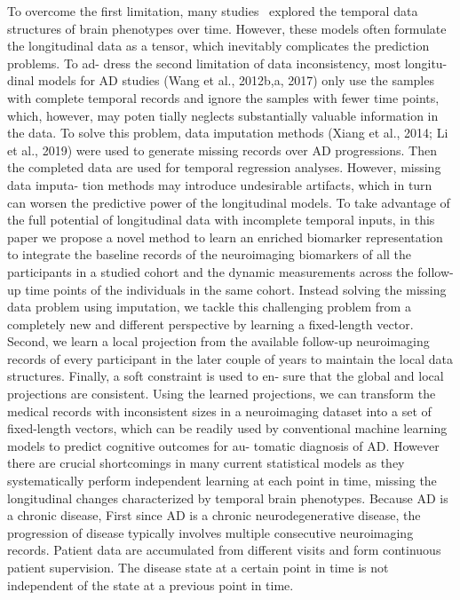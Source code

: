 To overcome the first limitation, many studies~\cite{brand2018joint,lu2018predicting} explored the temporal data structures of brain phenotypes over time. However, these models often formulate the longitudinal data as a tensor, which inevitably complicates the prediction problems. To ad- dress the second limitation of data inconsistency, most longitu- dinal models for AD studies (Wang et al., 2012b,a, 2017) only use the samples with complete temporal records and ignore the samples with fewer time points, which, however, may poten tially neglects substantially valuable information in the data. To solve this problem, data imputation methods (Xiang et al., 2014; Li et al., 2019) were used to generate missing records over AD progressions. Then the completed data are used for temporal regression analyses. However, missing data imputa- tion methods may introduce undesirable artifacts, which in turn can worsen the predictive power of the longitudinal models.
To take advantage of the full potential of longitudinal data with incomplete temporal inputs, in this paper we propose a novel method to learn an enriched biomarker representation to integrate the baseline records of the neuroimaging biomarkers of all the participants in a studied cohort and the dynamic measurements across the follow-up time points of the individuals in the same cohort. Instead solving the missing data problem using imputation, we tackle this challenging problem from a completely new and different perspective by learning a fixed-length vector. Second, we learn a local projection from the available follow-up neuroimaging records of every participant in the later couple of years to maintain the local data structures. Finally, a soft constraint is used to en- sure that the global and local projections are consistent. Using the learned projections, we can transform the medical records with inconsistent sizes in a neuroimaging dataset into a set of fixed-length vectors, which can be readily used by conventional machine learning models to predict cognitive outcomes for au- tomatic diagnosis of AD.
However there are crucial shortcomings in many current statistical models as they systematically perform independent learning at each point in time, missing the longitudinal changes characterized by temporal brain phenotypes.
Because AD is a chronic disease, First since AD is a chronic neurodegenerative disease, the progression of disease typically involves multiple consecutive neuroimaging records. Patient data are accumulated from different visits and form continuous patient supervision. The disease state at a certain point in time is not independent of the state at a previous point in time. 

